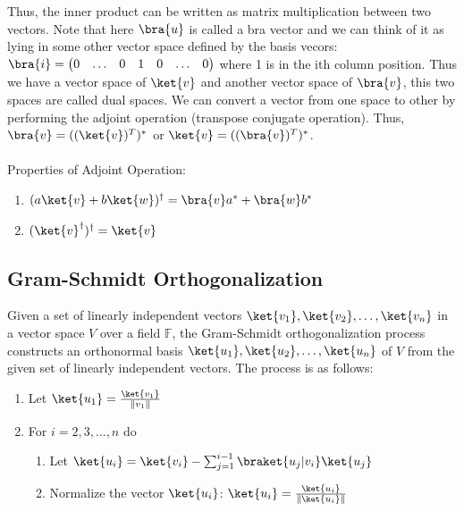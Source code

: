 \documentclass[12pt, oneside]{book}
\theoremstyle{definition}
\theoremstyle{definition}
\theoremstyle{remark}
\begin{document}
Thus, the inner product can be written as matrix multiplication between two vectors. 
Note that here $\bra{u}$ is called a bra vector and we can think of it as lying in some other vector space defined by the basis vecors:
$\bra{i}=\begin{pmatrix} 0 & \ldots & 0 & 1 & 0 & \ldots & 0 \end{pmatrix}$ where 1 is in the ith column position. Thus we have a vector space of $\ket{v}$ and another vector space
of $\bra{v}$, this two spaces are called dual spaces. We can convert a vector from one space to other by performing the adjoint operation (transpose conjugate operation). Thus, $\bra{v}=((\ket{v})^{T})^{*}$ or $\ket{v}=((\bra{v})^{T})^{*}$. \\
\\
Properties of Adjoint Operation:
\begin{enumerate}
    \item $(a\ket{v}+b\ket{w})^{\dagger}=\bra{v}a^{*}+\bra{w}b^{*}$
    \item $(\ket{v}^{\dagger})^{\dagger}=\ket{v}$
\end{enumerate}
\subsection{Gram-Schmidt Orthogonalization}
Given a set of linearly independent vectors $\ket{v_1},\ket{v_2},\ldots,\ket{v_n}$ in a vector space $V$ over a field $\mathbb{F}$, the Gram-Schmidt orthogonalization process constructs an orthonormal basis $\ket{u_1},\ket{u_2},\ldots,\ket{u_n}$ of $V$ from the given set of linearly independent vectors. The process is as follows:
\begin{enumerate}
    \item Let $\ket{u_1}=\frac{\ket{v_1}}{\|v_1\|}$
    \item For $i=2,3,\ldots,n$ do
    \begin{enumerate}
        \item Let $\ket{u_i}=\ket{v_i}-\sum_{j=1}^{i-1}\braket{u_j|v_i}\ket{u_j}$
        \item Normalize the vector $\ket{u_i}$: $\ket{u_i}=\frac{\ket{u_i}}{\|\ket{u_i}\|}$
    \end{enumerate}
\end{enumerate}
\end{document}
